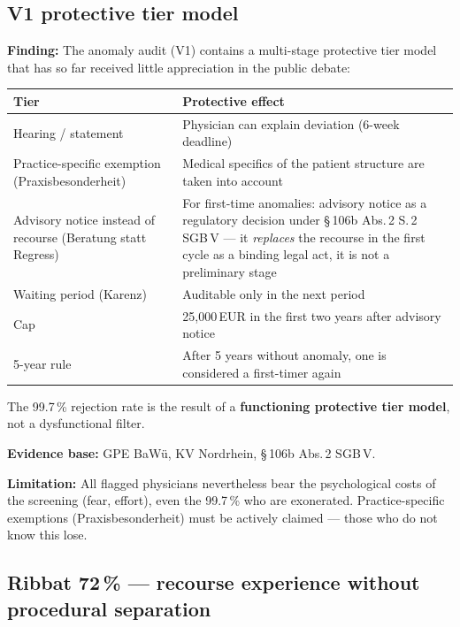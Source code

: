\documentclass{umbruch-position}
\providecommand{\textgerman}[1]{#1}
\begin{document}
\subsection{V1 protective tier model}

\textbf{Finding:} The anomaly audit (V1) contains a multi-stage protective tier model that has so far received little appreciation in the public debate:

\smallskip
{\small
\begin{tabularx}{\textwidth}{lX}
\hline
\textbf{Tier} & \textbf{Protective effect} \\
\hline
Hearing / statement & Physician can explain deviation (6-week deadline) \\
Practice-specific exemption (\textgerman{Praxisbesonderheit}) & Medical specifics of the patient structure are taken into account \\
Advisory notice instead of recourse (\textgerman{Beratung statt Regress}) & For first-time anomalies: advisory notice as a regulatory decision under \S\,106b Abs.\,2 S.\,2 SGB\,V --- it \emph{replaces} the recourse in the first cycle as a binding legal act, it is not a preliminary stage \\
Waiting period (\textgerman{Karenz}) & Auditable only in the next period \\
Cap & 25,000\,EUR in the first two years after advisory notice \\
5-year rule & After 5 years without anomaly, one is considered a first-timer again \\
\hline
\end{tabularx}
}
\smallskip

The 99.7\,\% rejection rate is the result of a \textbf{functioning protective tier model}, not a dysfunctional filter.

\textbf{Evidence base:} GPE BaW\"u, KV Nordrhein, \S\,106b Abs.\,2 SGB\,V.

\textbf{Limitation:} All flagged physicians nevertheless bear the psychological costs of the screening (fear, effort), even the 99.7\,\% who are exonerated. Practice-specific exemptions (\textgerman{Praxisbesonderheit}) must be actively claimed --- those who do not know this lose.

\subsection{Ribbat 72\,\% --- recourse experience without procedural separation}
\end{document}
